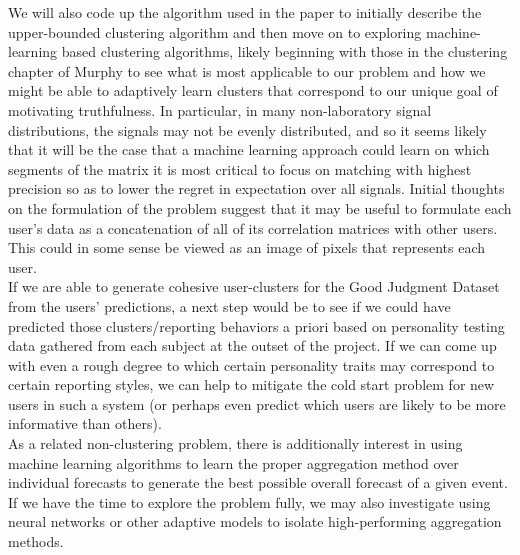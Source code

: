 \documentclass[a4paper, 12pt]{article}
\begin{document}
We will also code up the algorithm used in the paper to initially describe the upper-bounded clustering algorithm and then move on to exploring machine-learning based clustering algorithms, likely beginning with those in the clustering chapter of Murphy to see what is most applicable to our problem and how we might be able to adaptively learn clusters that correspond to our unique goal of motivating truthfulness. In particular, in many non-laboratory signal distributions, the signals may not be evenly distributed, and so it seems likely that it will be the case that a machine learning approach could learn on which segments of the matrix it is most critical to focus on matching with highest precision so as to lower the regret in expectation over all signals. Initial thoughts on the formulation of the problem suggest that it may be useful to formulate each user's data as a concatenation of all of its correlation matrices with other users. This could in some sense be viewed as an image of pixels that represents each user.\\

If we are able to generate cohesive user-clusters for the Good Judgment Dataset from the users' predictions, a next step would be to see if we could have predicted those clusters/reporting behaviors a priori based on personality testing data gathered from each subject at the outset of the project. If we can come up with even a rough degree to which certain personality traits may correspond to certain reporting styles, we can help to mitigate the cold start problem for new users in such a system (or perhaps even predict which users are likely to be more informative than others). \\

As a related non-clustering problem, there is additionally interest in using machine learning algorithms to learn the proper aggregation method over individual forecasts to generate the best possible overall forecast of a given event. If we have the time to explore the problem fully, we may also investigate using neural networks or other adaptive models to isolate high-performing aggregation methods.

\end{document}

